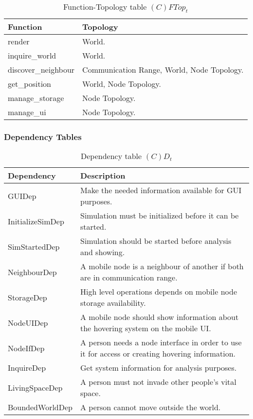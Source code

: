 \begin{table}[H]
	\centering
	\begin{tabular}{|p{4cm}|p{8cm}|}
			\hline
			\textbf{Function} & \textbf{Topology} \\
			\hline
			render & World.\\
			\hline
			inquire\_world & World.\\
			\hline
			discover\_neighbour & Communication Range, World, Node Topology. \\
			\hline
			get\_position & World, Node Topology. \\
			\hline
			manage\_storage & Node Topology. \\
			\hline
			manage\_ui & Node Topology. \\
			\hline
		\end{tabular}
	\caption{Function-Topology table $(C)FTop_t$}
	\label{tab:cftopt}
\end{table}


\subsubsection{Dependency Tables}

\begin{table}[H]
	\centering
	\begin{tabular}{|p{4cm}|p{8cm}|}
			\hline
			\textbf{Dependency} & \textbf{Description} \\
			\hline
			GUIDep & Make the needed information available for GUI purposes. \\
			\hline
			InitializeSimDep & Simulation must be initialized before it can be started. \\
			\hline
			SimStartedDep & Simulation should be started before analysis and showing. \\
			\hline
			NeighbourDep & A mobile node is a neighbour of another if both are in
			communication range. \\
			\hline
			StorageDep & High level operations depends on mobile node storage availability. \\
			\hline
			NodeUIDep & A mobile node should show information about the hovering
			system on the mobile UI. \\
			\hline
			NodeIfDep & A person needs a node interface in order to use it for access
			or creating hovering information. \\
			\hline
			InquireDep & Get system information for analysis purposes. \\
			\hline
			LivingSpaceDep & A person must not invade other people's vital space. \\
			\hline
			BoundedWorldDep & A person cannot move outside the world. \\
			\hline
		\end{tabular}
	\caption{Dependency table $(C)D_t$}
	\label{tab:cdt}
\end{table}


